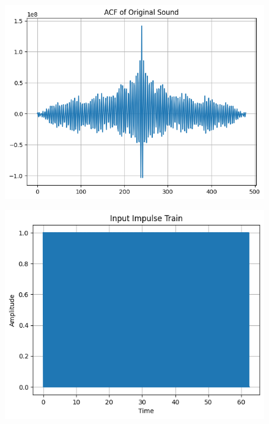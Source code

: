 \documentclass{article}
\begin{document}
\begin{figure}[H]
\begin{center}
\includegraphics[scale = 0.8]{acf_act2.png}
\end{center}
\end{figure}

\begin{figure}[H]
\begin{center}
\includegraphics[scale = 0.8]{imp2.png}
\end{center}
\end{figure}
\end{document}
